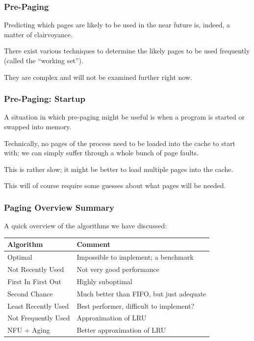 \begin{frame}
\frametitle{Pre-Paging}

Predicting which pages are likely to be used in the near future is, indeed, a matter of clairvoyance. 

There exist various techniques to determine the likely pages to be used frequently (called the ``working set'').

They are complex and will not be examined further right now.

\end{frame}

\begin{frame}
\frametitle{Pre-Paging: Startup}

A situation in which pre-paging might be useful is when a program is started or swapped into memory. 

Technically, no pages of the process need to be loaded into the cache to start with; we can simply suffer through a whole bunch of page faults. 

This is rather slow; it might be better to load multiple pages into the cache.

This will of course require some guesses about what pages will be needed.

\end{frame}

\begin{frame}
\frametitle{Paging Overview Summary}

A quick overview of the algorithms we have discussed:

\begin{center}
\begin{tabular}{l|l}
	\textbf{Algorithm} & \textbf{Comment} \\ \hline
	Optimal & Impossible to implement; a benchmark\\
	Not Recently Used &  Not very good performance \\
	First In First Out & Highly suboptimal \\
	Second Chance & Much better than FIFO, but just adequate \\
	Least Recently Used & Best performer, difficult to implement? \\
	Not Frequently Used & Approximation of LRU \\
	NFU + Aging & Better approximation of LRU\\
\end{tabular}
\end{center}


\end{frame}

